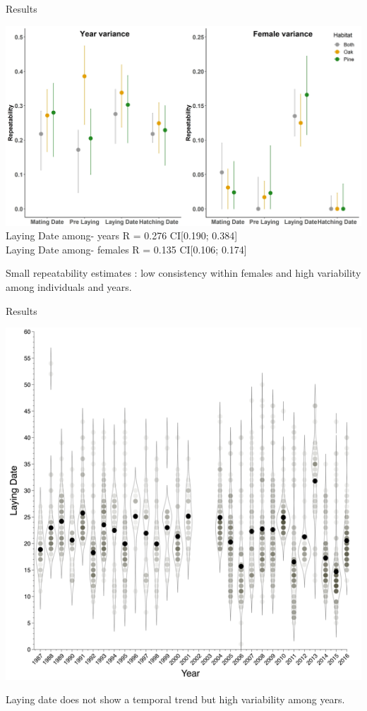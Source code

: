 \documentclass[compress]{beamer}
\begin{document}
\begin{frame}{Results}\vspace{10pt}

 \centering
 \includegraphics[height = 5.5 cm]{Chapter/REP.jpg} \\
\scriptsize Laying Date among- years R = 0.276 CI[0.190; 0.384] \\
Laying Date among- females R = 0.135 CI[0.106; 0.174] \\
\raggedright
\small
\vspace{0.3cm}
Small repeatability estimates : low consistency within females and high variability among individuals and years.
\end{frame}
\begin{frame}{Results}\vspace{10pt}

 \centering
 \includegraphics[height = 7 cm]{Chapter/Layingdate.png} \\
 \vspace{0.065cm}
 \raggedright
Laying date does not show a temporal trend but high variability among years. 


\end{frame}
\end{document}
